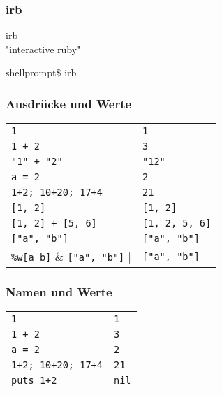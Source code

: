 \documentclass{beamer}
\begin{document}
\begin{frame}[fragile]
  \frametitle{irb}
  \begin{center}
   {\LARGE irb}\\
   
   \bigskip
   "interactive ruby"
   \bigskip
   \bigskip
   \bigskip
   \bigskip
   
  \end{center}
   shellprompt\$ irb

\end{frame}

\begin{frame}[fragile]
  \frametitle{Ausdrücke und Werte}
  \begin{tabular}[t]{l@{\hspace{5em}$\longrightarrow$}l}
    \verb|1|                   &   \verb|1|  \\ \pause
    \verb|1 + 2|               &   \verb|3|  \\ \pause
    \verb|"1" + "2"|           &   \verb|"12"|  \\ \pause
    \verb|a = 2|               &   \verb|2|  \\ \pause
    \verb|1+2; 10+20; 17+4|    &   \verb|21|  \\ \pause
    \verb|[1, 2]|              &   \verb|[1, 2]|  \\ \pause
    \verb|[1, 2] + [5, 6]|     &   \verb|[1, 2, 5, 6]|  \\ \pause
    \verb|["a", "b"]|          &   \verb|["a", "b"]|  \\ \pause
    \verb|%w[a b]|             &   \verb|["a", "b"]|  
  \end{tabular}
  
\end{frame}

\begin{frame}[fragile]
  \frametitle{Namen und Werte}
  \begin{tabular}[t]{l@{\hspace{5em}$\longrightarrow$}l}
    \lstinline|1|       &   \lstinline|1|  \\
    \lstinline|1 + 2|   &   \lstinline|3|  \\
    \lstinline|a = 2|   &   \lstinline|2|  \\
    \lstinline|1+2; 10+20; 17+4|  &   \lstinline|21|  \\
    \lstinline|puts 1+2|   &   \lstinline|nil|  \\
  \end{tabular}
  
\end{frame}
\end{document}
